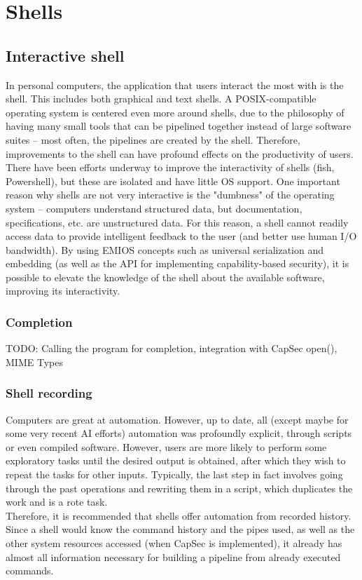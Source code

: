 \documentclass[a4paper,utf8,11pt]{article}
\begin{document}
	\section{Shells}
	\subsection{Interactive shell}
	In personal computers, the application that users interact the most with is the shell. This includes both graphical and text shells. A POSIX-compatible operating system is centered even more around shells, due to the philosophy of having many small tools that can be pipelined together instead of large software suites -- most often, the pipelines are created by the shell. Therefore, improvements to the shell can have profound effects on the productivity of users.\\
	There have been efforts underway to improve the interactivity of shells (fish, Powershell), but these are isolated and have little OS support. One important reason why shells are not very interactive is the "dumbness" of the operating system -- computers understand structured data, but documentation, specifications, etc. are unstructured data. For this reason, a shell cannot readily access data to provide intelligent feedback to the user (and better use human I/O bandwidth). By using EMIOS concepts such as universal serialization and embedding (as well as the API for implementing capability-based security), it is possible to elevate the knowledge of the shell about the available software, improving its interactivity.
	\subsubsection{Completion}
	TODO: Calling the program for completion, integration with CapSec open(), MIME Types
	\subsubsection{Shell recording}
	Computers are great at automation. However, up to date, all (except maybe for some very recent AI efforts) automation was profoundly explicit, through scripts or even compiled software. However, users are more likely to perform some exploratory tasks until the desired output is obtained, after which they wish to repeat the tasks for other inputs. Typically, the last step in fact involves going through the past operations and rewriting them in a script, which duplicates the work and is a rote task.\\
	Therefore, it is recommended that shells offer automation from recorded history. Since a shell would know the command history and the pipes used, as well as the other system resources accessed (when CapSec is implemented), it already has almost all information necessary for building a pipeline from already executed commands.
	\clearpage
\end{document}
